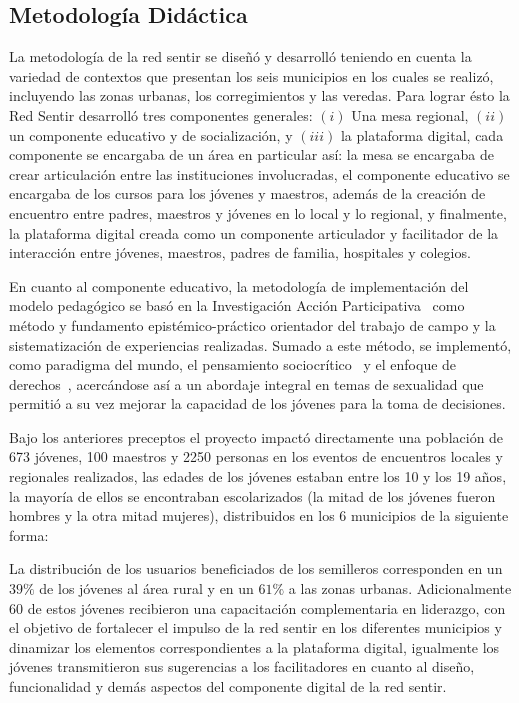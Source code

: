 \documentclass[journal,transmag]{IEEEtran}
\begin{document}
\subsection{Metodología Didáctica}

La metodología de la red sentir se diseñó y desarrolló teniendo en cuenta la variedad de contextos que presentan los seis municipios en los cuales se realizó, incluyendo las zonas urbanas, los corregimientos y las veredas. Para lograr ésto la Red Sentir desarrolló tres componentes generales: $(i)$ Una mesa regional, $(ii)$ un componente educativo y de socialización, y $(iii)$ la plataforma digital, cada componente se encargaba de un área en particular así: la mesa se encargaba de crear articulación entre las instituciones  involucradas, el componente educativo se encargaba de los cursos para los jóvenes y maestros, además de la creación de encuentro entre padres, maestros y jóvenes en lo local y lo regional, y finalmente, la plataforma digital creada como un componente articulador y facilitador de la interacción entre jóvenes, maestros, padres de familia, hospitales y colegios.

En cuanto al componente educativo, la metodología de implementación del modelo pedagógico se basó en la Investigación Acción Participativa~\cite{fals2008socialismo} como método y fundamento epistémico-práctico orientador del trabajo de campo y la sistematización de experiencias realizadas. Sumado a este método, se implementó, como paradigma del mundo, el pensamiento sociocrítico~\cite{stanley1991postmodern} y el enfoque de derechos~\cite{unesco}, acercándose así a un abordaje integral en temas de sexualidad que permitió a su vez mejorar la capacidad de los jóvenes para la toma de decisiones.

Bajo los anteriores preceptos el proyecto impactó directamente una población de 673 jóvenes, 100 maestros y 2250 personas en los eventos de encuentros locales y regionales realizados, las edades de los jóvenes estaban entre los 10 y los 19 años, la mayoría de ellos se encontraban escolarizados (la mitad de los jóvenes fueron hombres y la otra mitad mujeres), distribuidos en los 6 municipios de la siguiente forma: 

La distribución de los usuarios beneficiados de los semilleros corresponden en un $39\%$ de los jóvenes al área rural y en un $61\%$ a las zonas urbanas. Adicionalmente 60 de estos jóvenes recibieron una capacitación complementaria en liderazgo, con el objetivo de fortalecer el impulso de la red sentir en los diferentes municipios y dinamizar los elementos correspondientes a la plataforma digital, igualmente los jóvenes transmitieron sus sugerencias a los facilitadores en cuanto al diseño, funcionalidad y demás aspectos del componente digital de la red sentir.
%
\end{document}
